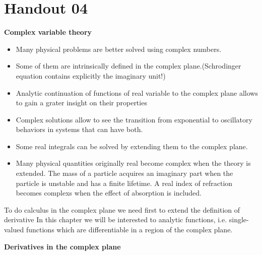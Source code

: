 \documentclass{article}
\begin{document}
\newpage

\section{Handout 04}

\large
\begin{center}
    \textbf{Complex variable theory}
\end{center}

\normalsize
\noindent
\begin{itemize}
    \item Many physical problems are better solved using complex numbers.
    \item Some of them are intrinsically defined in the complex plane.(Schrodinger equation contains explicitly the imaginary unit!)
    \item Analytic continuation of functions of real variable to the complex plane allows to gain a grater insight on their properties
    \item Complex solutions allow to see the transition from exponential to oscillatory behaviors in systems that can have both.
    \item Some real integrals can be solved by extending them to the complex plane.
    \item Many physical quantities originally real become complex when the theory is extended. The mass of a particle acquires an imaginary part when the particle is unstable and has a finite lifetime. A real index of refraction becomes complexs when the effect of absorption is included.
\end{itemize}

\noindent
To do calculus in the complex plane we need first to extend the definition of derivative In this chapter we will be interested to analytic functions, i.e. single-valued functions which are differentiable in a region of the complex plane.


\vspace{2mm} \noindent
\textbf{Derivatives in the complex plane}
\end{document}
